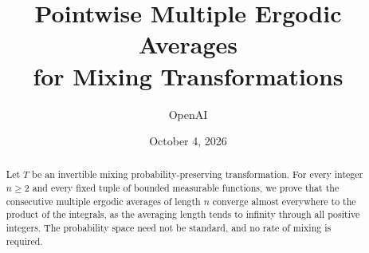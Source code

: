 \documentclass[11pt]{article}
\title{Pointwise Multiple Ergodic Averages\\for Mixing Transformations}
\author{OpenAI}
\date{October 4, 2026}
\theoremstyle{definition}
\theoremstyle{remark}
\numberwithin{equation}{section}
\begin{document}
\maketitle
\begin{abstract}
Let $T$ be an invertible mixing probability-preserving transformation.
For every integer $n\ge2$ and every fixed tuple of bounded measurable
functions, we prove that the consecutive multiple ergodic averages of
length $n$ converge almost everywhere to the product of the integrals,
as the averaging length tends to infinity through all positive integers.
The probability space need not be standard, and no rate of mixing is
required.
\end{abstract}






\appendix


\begingroup\raggedright

\endgroup
\end{document}
